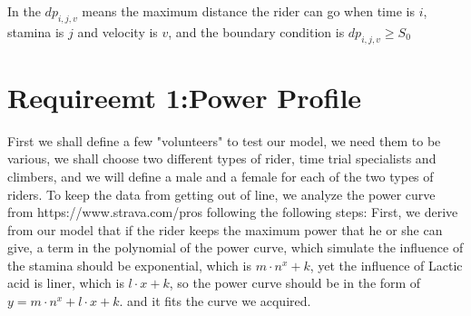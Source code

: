 \documentclass[12pt]{article}
\begin{document}
In the $dp_{i,j,v}$ means the maximum distance the rider can go when time is $i$, stamina is $j$ and velocity is $v$, and the boundary condition is $dp_{i,j,v}\geqslant S_0$
\section{Requireemt 1:Power Profile}
First we shall define a few "volunteers" to test our model, we need them to be various, we shall choose two different types of rider, time trial
specialists and climbers, and we will define a male and a female for each of the two types of riders. %
To keep the data from getting out of line, we analyze the power curve
from https://www.strava.com/pros following the following steps:
First, we derive from our model that if the rider keeps the maximum power that he or she can give, a term in the polynomial of the power curve,  which simulate the influence of the stamina should be exponential,
which is $m\cdot n^x+k$, yet the influence of Lactic acid is liner, which is $l\cdot x+k$, so the power curve should be in the form of $y=m\cdot n^x+l\cdot x+k$.
and it fits the curve we acquired.
\end{document}

